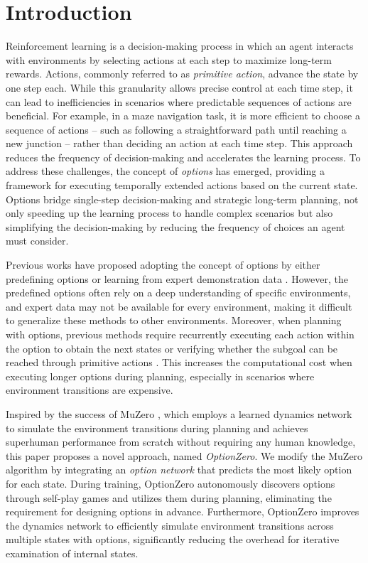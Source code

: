 \section{Introduction}
Reinforcement learning is a decision-making process in which an agent interacts with environments by selecting actions at each step to maximize long-term rewards.
Actions, commonly referred to as \textit{primitive action}, advance the state by one step each.
While this granularity allows precise control at each time step, it can lead to inefficiencies in scenarios where predictable sequences of actions are beneficial.
For example, in a maze navigation task, it is more efficient to choose a sequence of actions -- such as following a straightforward path until reaching a new junction -- rather than deciding an action at each time step.
This approach reduces the frequency of decision-making and accelerates the learning process.
To address these challenges, the concept of \textit{options} \cite{sutton_mdps_1999} has emerged, providing a framework for executing temporally extended actions based on the current state.
Options bridge single-step decision-making and strategic long-term planning, not only speeding up the learning process to handle complex scenarios but also simplifying the decision-making by reducing the frequency of choices an agent must consider.

Previous works have proposed adopting the concept of options by either predefining options or learning from expert demonstration data \cite{sharma_learning_2016,durugkar_deep_2016,dewaard_monte_2016,gabor_subgoalbased_2019,czechowski_subgoal_2021,kujanpaa_hierarchical_2023,kujanpaa_hybrid_2024}.
However, the predefined options often rely on a deep understanding of specific environments, and expert data may not be available for every environment, making it difficult to generalize these methods to other environments.
Moreover, when planning with options, previous methods require recurrently executing each action within the option to obtain the next states \cite{dewaard_monte_2016} or verifying whether the subgoal can be reached through primitive actions \cite{czechowski_subgoal_2021,kujanpaa_hierarchical_2023,kujanpaa_hybrid_2024}.
This increases the computational cost when executing longer options during planning, especially in scenarios where environment transitions are expensive.

Inspired by the success of MuZero \cite{schrittwieser_mastering_2020}, which employs a learned dynamics network to simulate the environment transitions during planning and achieves superhuman performance from scratch without requiring any human knowledge, this paper proposes a novel approach, named \textit{OptionZero}.
We modify the MuZero algorithm by integrating an \textit{option network} that predicts the most likely option for each state.
During training, OptionZero autonomously discovers options through self-play games and utilizes them during planning, eliminating the requirement for designing options in advance.
Furthermore, OptionZero improves the dynamics network to efficiently simulate environment transitions across multiple states with options, significantly reducing the overhead for iterative examination of internal states.

